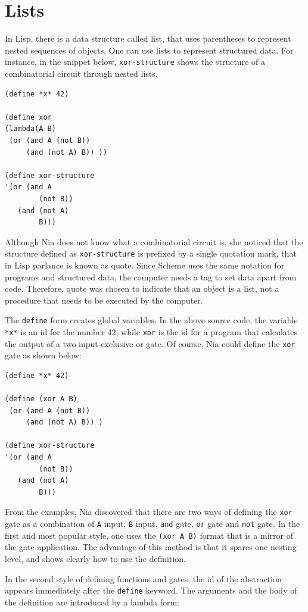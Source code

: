 \documentclass[a4paper,12pt]{book}
\begin{document}
\section{Lists}
In Lisp, there is a data structure called list,
that uses parentheses to represent nested
sequences of objects. One can use lists to
represent structured data.
For instance, in the snippet below,
\verb|xor-structure| shows
the structure of a combinatorial circuit
through nested lists.

\begin{verbatim}
(define *x* 42)

(define xor
(lambda(A B)
 (or (and A (not B))
     (and (not A) B)) ))

(define xor-structure
'(or (and A  
        (not B))
   (and (not A) 
        B)))
\end{verbatim}

Although Nia does not know what a combinatorial 
circuit is, she noticed that the structure
defined as \verb|xor-structure| is prefixed by a
single quotation mark, that in Lisp parlance is
known as quote. Since Scheme uses the
same notation for programs and structured
data, the computer needs a tag to set
data apart from code. Therefore, 
quote was chosen to indicate that
an object is a list, not a procedure that
needs to be executed by the computer.

The \verb|define| form creates global
variables. In the above source code,
the variable \verb|*x*| is an id for the
number 42,
while \verb|xor| is the id for a program
that calculates the output of a two
input exclusive or gate. Of course, Nia
could define the \verb|xor| gate as shown below:
\begin{verbatim}
(define *x* 42)

(define (xor A B)
 (or (and A (not B))
     (and (not A) B)) )

(define xor-structure
'(or (and A 
        (not B))
   (and (not A) 
        B)))
\end{verbatim}

From the examples, Nia discovered that there
are two ways of defining the \verb|xor| gate
as a combination of \verb|A| input, \verb|B| input,
\verb|and| gate, \verb|or| gate
and \verb|not| gate. In the first and
most popular style, one uses the
\verb|(xor A B)| format that is a mirror of
the gate application. The advantage of
this method is that it spares one
nesting level, and shows clearly how to use
the definition. 

In the second style of defining functions and
gates, the id of the abstraction 
appears immediately after the \verb|define|
keyword. The  arguments and the body of
the definition are introduced by a lambda form:
\label{page:lambda1}
\end{document}
